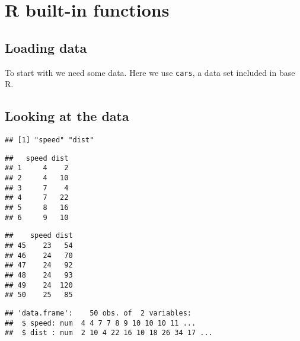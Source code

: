 \chapter{R built-in functions}


\section{Loading data}

To start with we need some data. Here we use \texttt{cars}, a data set included in base R.

\begin{knitrout}
\color{fgcolor}\begin{kframe}
\begin{alltt}
\end{alltt}
\end{kframe}
\end{knitrout}

\section{Looking at the data}

\begin{knitrout}
\color{fgcolor}\begin{kframe}
\begin{alltt}
\end{alltt}
\begin{verbatim}
## [1] "speed" "dist"
\end{verbatim}
\begin{alltt}
\end{alltt}
\begin{verbatim}
##   speed dist
## 1     4    2
## 2     4   10
## 3     7    4
## 4     7   22
## 5     8   16
## 6     9   10
\end{verbatim}
\begin{alltt}
\end{alltt}
\begin{verbatim}
##    speed dist
## 45    23   54
## 46    24   70
## 47    24   92
## 48    24   93
## 49    24  120
## 50    25   85
\end{verbatim}
\begin{alltt}
\end{alltt}
\begin{verbatim}
## 'data.frame':	50 obs. of  2 variables:
##  $ speed: num  4 4 7 7 8 9 10 10 10 11 ...
##  $ dist : num  2 10 4 22 16 10 18 26 34 17 ...
\end{verbatim}
\end{kframe}
\end{knitrout}

